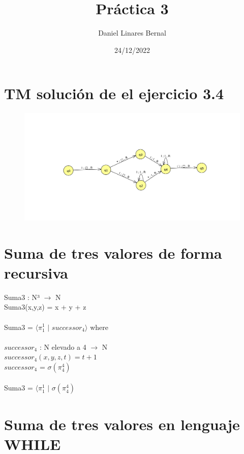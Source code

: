 \documentclass[11pt]{article}
\title{\textbf{Práctica 3}}
\author{Daniel Linares Bernal}
\date{24/12/2022}
\begin{document}
\maketitle
\thispagestyle{empty}

\section{TM solución de el ejercicio 3.4}
\begin{figure}[h]
\centering
\includegraphics[width=1.2\linewidth]{TM.png}
\end{figure}

\section{Suma de tres valores de forma recursiva}
Suma3 : N³ $\rightarrow$ N\\ Suma3(x,y,z) = x + y + z\\\\
Suma3 = $\langle \pi_1^1$ $|$ $successor_4 \rangle$ where\\\\
$successor_4$ : N elevado a 4 $\rightarrow$ N\\
$successor_4(x,y,z,t) = t + 1$\\
$successor_4$ = $\sigma  (\pi_4^4)$\\\\
Suma3 = $\langle \pi_1^1$ $|$ $\sigma(\pi_4^4)$

\section{Suma de tres valores en lenguaje WHILE}
\end{document}
